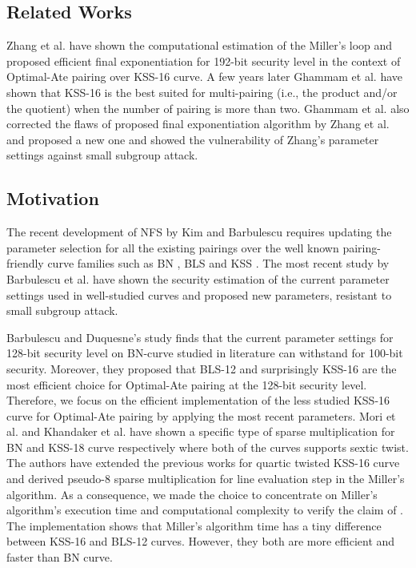 \subsection{Related Works}
Zhang et al. \cite{INDOCRYPT:ZhaLin12} have shown the computational estimation of the Miller's loop and proposed efficient final exponentiation for 192-bit security level in the context of Optimal-Ate pairing over KSS-16 curve. 
A few years later Ghammam et al. \cite{EPRINT:GhaFou16b} have shown that KSS-16 is the best suited for multi-pairing (i.e., the product and/or the quotient) when the number of pairing is more than two. 
Ghammam et al. \cite{EPRINT:GhaFou16b} also corrected the flaws of proposed final exponentiation algorithm by Zhang et al. \cite{INDOCRYPT:ZhaLin12} and proposed a new one and showed the vulnerability of Zhang's parameter settings against small subgroup attack. 

\subsection{Motivation}
The recent development of NFS by Kim and Barbulescu \cite{C:KimBar16} requires updating the parameter selection for all the existing pairings over the well known pairing-friendly curve families such as BN \cite{SAC:BarNae05}, BLS \cite{EPRINT:FreScoTes06} and KSS \cite{EPRINT:KacSchSco07}.
The most recent study by Barbulescu et al. \cite{EPRINT:BarDuq17} have shown the security estimation of the current parameter settings used in well-studied curves and proposed new parameters, resistant to small subgroup attack.

Barbulescu and Duquesne's study finds that the current parameter settings for 128-bit security level on BN-curve studied in literature can withstand for 100-bit security. 
Moreover, they proposed that BLS-12 and surprisingly KSS-16 are the most efficient choice for Optimal-Ate pairing at the 128-bit security level. Therefore, we focus on the efficient implementation of the less studied KSS-16 curve for Optimal-Ate pairing by applying the most recent parameters.
Mori et al. \cite{PAIRING:MANS13} and Khandaker et al. \cite{ICISC:KONSD16} have shown a specific type of sparse multiplication for BN and KSS-18 curve respectively where both of the curves supports sextic twist. 
The authors have extended the previous works for quartic twisted KSS-16 curve and derived pseudo-8 sparse multiplication for line evaluation step in the Miller's algorithm. 
As a consequence, we made the choice to concentrate on Miller's algorithm's execution time and computational complexity to verify the claim of \cite{EPRINT:BarDuq17}.
The implementation shows that Miller's algorithm time has a tiny difference between KSS-16 and BLS-12 curves. However, they both are more efficient and faster than BN curve. 


